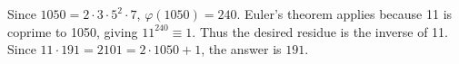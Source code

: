 Since $ 1050=2\cdot3\cdot5^2\cdot7 $, $\varphi(1050)=240 $. Euler's theorem applies because 11 is coprime to 1050, giving $ 11^{240}\equiv1 $. Thus the desired residue is the inverse of 11. Since $ 11\cdot191=2101=2\cdot1050+1 $, the answer is $\boxed{191}$.
